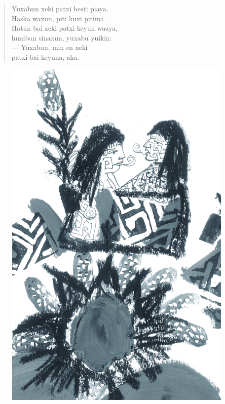\begin{verse}
Yuxabun xeki patxi besti piaya.\\
Haska waxun, piti kuxi pitima.\\
Hatun bai xeki patxi keyun waaya,\\
hunibun sinaxun, yuxabu yuikin:\\
— Yuxabun, min en xeki\\
patxi bai keyuna, aka.\\
\end{verse}

\vspace*{\fill}

\pagebreak
\thispagestyle{empty}
\begin{figure}
\vspace*{-1.6cm}
\hspace*{-2.2cm}\includegraphics[width=138mm]{./imgs/img5.jpg}
\end{figure}

